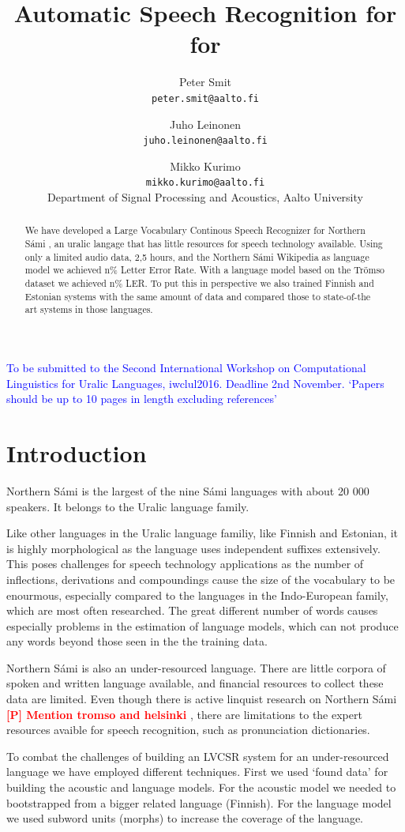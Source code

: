 \documentclass[b5paper]{article}
\title{Automatic Speech Recognition for  for \ns}
\author{Peter Smit \\ \texttt{peter.smit@aalto.fi} \and Juho Leinonen \\ \texttt{juho.leinonen@aalto.fi} \and Mikko Kurimo\\ \texttt{mikko.kurimo@aalto.fi}  \\
[0.5cm]Department of Signal Processing and Acoustics, Aalto University\\}
\newcommand{\todo}[2]{{\textcolor{red}{\bf [#1] #2 }}}
\newcommand{\note}[1]{{\textcolor{blue}{#1}}}
\newcommand{\ns}{{Northern Sámi }}
\begin{document}
\maketitle

\begin{abstract} We have developed a Large Vocabulary Continous Speech Recognizer for \ns, an uralic langage that has little resources for speech technology available. Using only a limited audio data, 2,5 hours, and the \ns Wikipedia as language model we achieved n\% Letter Error Rate. With a language model based on the Trömso dataset we achieved n\% LER. To put this in perspective we also trained Finnish and Estonian systems with the same amount of data and compared those to state-of-the art systems in those languages.   \end{abstract}

\note{To be submitted to the Second International Workshop on Computational Linguistics for Uralic Languages, iwclul2016. Deadline 2nd November. `Papers should be up to 10 pages in length excluding references'}
\section{Introduction}

\ns is the largest of the nine Sámi languages with about 20 000 speakers. It belongs to the Uralic language family.

Like other languages in the Uralic language familiy, like Finnish and Estonian, it is highly morphological as the language uses independent suffixes extensively. This poses challenges for speech technology applications as the number of inflections, derivations and compoundings cause the size of the vocabulary to be enourmous, especially compared to the languages in the Indo-European family, which are most often researched. The great different number of words causes especially problems in the estimation of language models, which can not produce any words beyond those seen in the the training data. 

\ns is also an under-resourced language. There are little corpora of spoken and written language available, and financial resources to collect these data are limited. Even though there is active linquist research on \ns \todo{P}{Mention tromso and helsinki}, there are limitations to the expert resources avaible for speech recognition, such as pronunciation dictionaries. 

To combat the challenges of building an LVCSR system for an under-resourced language we have employed different techniques. First we used `found data' for building the acoustic and language models. For the acoustic model we needed to bootstrapped from a bigger related language (Finnish). For the language model we used subword units (morphs) to increase the coverage of the language.
\end{document}
